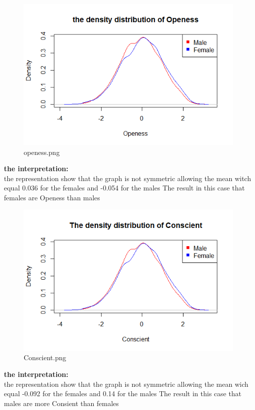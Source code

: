 \begin{figure}[]
\setlength{\abovecaptionskip}{-4pt}
\begin{center}
  \includegraphics{openess.png} 
  \caption{openess.png}
\end{center}
\end{figure}
{\normalsize{\bf the interpretation:}} \\\vspace{0.5cm}
the representation show that the graph is not symmetric allowing 
the mean witch equal 0.036 for the females and -0.054 for the males
The result in this case that females are Openess than males

\begin{figure}[]
\setlength{\abovecaptionskip}{-4pt}
\begin{center}
\includegraphics{Conscient.png}
  \caption{Conscient.png}
  \end{center}
\end{figure}

{\normalsize{\bf the interpretation:}} \\\vspace{0.5cm}
the representation show that the graph is not symmetric allowing 
the mean wich equal -0.092 for the females and 0.14 for the males
The result in this case that males are  more Consient  than females







